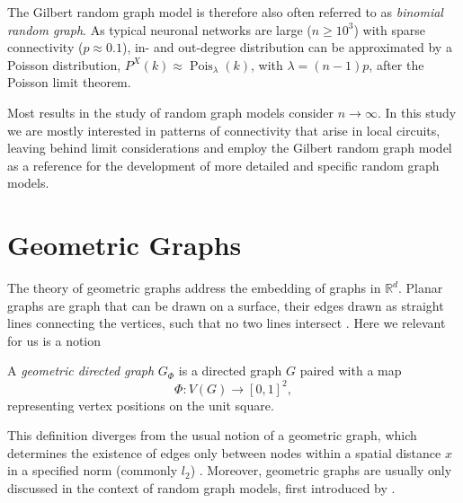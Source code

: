 The Gilbert random graph model is therefore also often referred to as
\textit{binomial random graph}. %
As typical neuronal networks are large ($n \geq 10^3$) with sparse
connectivity ($p \approx 0.1$), in- and out-degree distribution can be
approximated by a Poisson distribution, $P^X(k) \approx
\operatorname{Pois}_{\lambda}(k)$, with $\lambda = (n-1)p$, after the
Poisson limit theorem.

Most results in the study of random graph models consider $n\to
\infty$. In this study we are mostly interested in patterns of
connectivity that arise in local circuits, leaving behind limit
considerations and employ the Gilbert random graph model as a
reference for the development of more detailed and specific random
graph models.




\section{Geometric Graphs}\label{sec:geometric_graphs} 


The theory of geometric graphs address the embedding of graphs in
$\mathbb{R}^d$.  Planar graphs are graph that can be drawn on a
surface, their edges drawn as straight lines connecting the vertices,
such that no two lines intersect \parencite{Diestel_Graph-theory}. %
Here we relevant for us is a notion \textcite{Penrose_Geometric-graph}

\begin{definition}
  A \textit{geometric directed graph}
  $G_{\Phi}$ is a directed graph $G$ paired with a map
  \[
    \Phi:V(G) \to [0,1]^2,
  \]
  representing vertex positions on the unit square.
\end{definition}

\begin{remark} This definition diverges from the usual notion of a
  geometric graph, which determines the existence of edges only
  between nodes within a spatial distance $x$ in a specified norm
  (commonly $l_2$) \parencite[108]{Mesbahi_Multiagent-networks}.
  Moreover, geometric graphs are usually only discussed in the context
  of random graph models, first introduced by \textcite{Gilbert1961}. 
\end{remark} 

